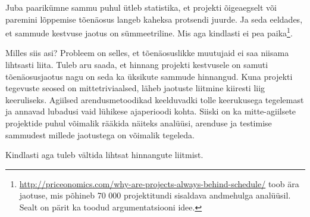 Juba paarikümne sammu puhul ütleb statistika, et projekti õigeaegselt või paremini lõppemise tõenäosus langeb kaheksa protsendi juurde. Ja seda eeldades, et sammude kestvuse jaotus on sümmeetriline. Mis aga kindlasti ei pea paika\footnote{\url{http://priceonomics.com/why-are-projects-always-behind-schedule/} toob ära jaotuse, mis põhineb 70 000 projektitundi sisaldava andmehulga analüüsil. Sealt on pärit ka toodud argumentatsiooni idee.}. 

Milles siis asi? Probleem on selles, et tõenäosuslikke muutujaid ei saa niisama lihtsasti liita. Tuleb aru saada, et hinnang projekti kestvusele on samuti tõenäosusjaotus nagu on seda ka üksikute sammude hinnangud. Kuna projekti tegevuste seosed on mittetriviaalsed, läheb jaotuste liitmine kiiresti liig keeruliseks. Agiilsed arendusmetoodikad keelduvadki tolle keerukusega tegelemast ja annavad lubadusi vaid lühikese ajaperioodi kohta. Siiski on ka mitte-agiilsete projektide puhul võimalik rääkida näiteks analüüsi, arenduse ja testimise sammudest millede jaotustega on võimalik tegeleda.  

Kindlasti aga tuleb vältida lihtsat hinnangute liitmist.

